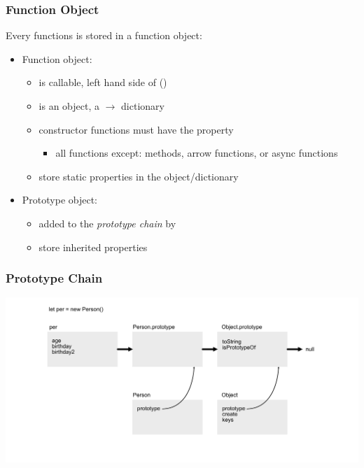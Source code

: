 \begin{frame}[fragile] \frametitle{Function Object}
Every functions is stored in a function object:
\begin{itemize}
  \item Function object:
  \begin{itemize}
    \item is callable, left hand side of ()
	\item is an object, a  $\rightarrow$  dictionary
    \item constructor functions must have the property 
      \begin{itemize}
        \item all functions except: methods, arrow functions, or async functions
      \end{itemize}
      \item store static properties in the object/dictionary
    \end{itemize}
\end{itemize}
\begin{itemize}
  \item Prototype object:
  \begin{itemize}
    \item added to the \emph{prototype chain} by 
    \item store inherited properties
  \end{itemize}
\end{itemize}
\end{frame}

\begin{frame}[fragile]
\frametitle{Prototype Chain}
  \centering
  \includegraphics[width=14cm]{img/prototype_chain2}
\end{frame}

